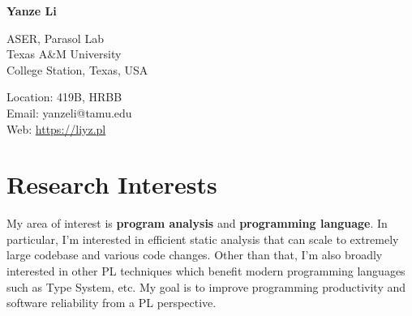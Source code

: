 \documentclass[12pt,letterpaper]{report}
\newcommand{\myname}{Yanze Li}
\newcommand{\namefont}[1]{{\normalfont\bfseries\Huge{#1}}}
\newcommand{\listitemspace}{0.15em}
\renewenvironment{itemize}
{\begin{list}{}{\setlength{\leftmargin}{0em}
			\setlength{\parskip}{0em}
			\setlength{\itemsep}{\listitemspace}
			\setlength{\parsep}{\listitemspace}}}
	{\end{list}}
\begin{document}
	\raggedright
	
	\namefont{\myname}
	
	\vspace{1em}
	\begin{minipage}[t]{0.495\textwidth}
		ASER, Parasol Lab \\
		Texas A\&M University \\
		College Station, Texas, USA
	\end{minipage}
	\begin{minipage}[t]{0.495\textwidth}
		Location: 419B, HRBB \\
		Email: yanzeli@tamu.edu \\
		Web: \href{https://liyz.pl}{https://liyz.pl} \\
	\end{minipage}
	\vspace{0.5em}
	

	
	\section*{Research Interests}
	
	\begin{itemize}
		\item My area of interest is \textbf{program analysis} and \textbf{programming language}. 
		In particular, I'm interested in efficient static analysis that can scale to extremely large codebase and various code changes.
		Other than that, I'm also broadly interested in other PL techniques which benefit modern programming languages such as Type System, etc.
		My goal is to improve programming productivity and software reliability from a PL perspective.
	\end{itemize}

\end{document}
